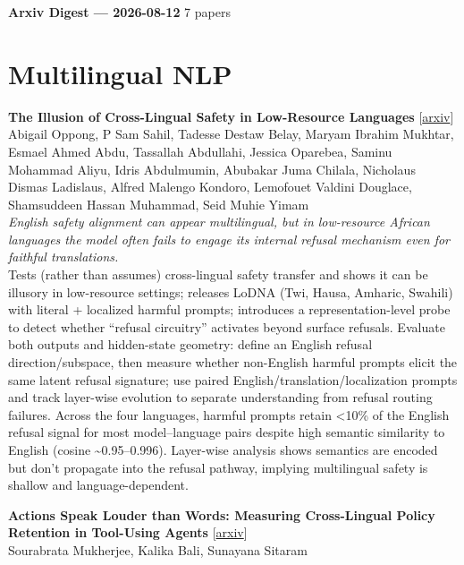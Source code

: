 \documentclass[12pt,letterpaper]{article}
\begin{document}
{\footnotesize\textbf{Arxiv Digest --- 2026-08-12} \hfill 7 papers}

\smallskip

\section*{Multilingual NLP}

{\small\textbf{The Illusion of Cross-Lingual Safety in Low-Resource Languages}} {\scriptsize[\href{https://arxiv.org/abs/2608.11146}{arxiv}]}\\
{\scriptsize Abigail Oppong, P Sam Sahil, Tadesse Destaw Belay, Maryam Ibrahim Mukhtar, Esmael Ahmed Abdu, Tassallah Abdullahi, Jessica Oparebea, Saminu Mohammad Aliyu, Idris Abdulmumin, Abubakar Juma Chilala, Nicholaus Dismas Ladislaus, Alfred Malengo Kondoro, Lemofouet Valdini Douglace, Shamsuddeen Hassan Muhammad, Seid Muhie Yimam}\\

{\small\textit{English safety alignment can appear multilingual, but in low-resource African languages the model often fails to engage its internal refusal mechanism even for faithful translations.}}\\[1pt]
{\footnotesize Tests (rather than assumes) cross-lingual safety transfer and shows it can be illusory in low-resource settings; releases LoDNA (Twi, Hausa, Amharic, Swahili) with literal + localized harmful prompts; introduces a representation-level probe to detect whether ``refusal circuitry'' activates beyond surface refusals. Evaluate both outputs and hidden-state geometry: define an English refusal direction/subspace, then measure whether non-English harmful prompts elicit the same latent refusal signature; use paired English/translation/localization prompts and track layer-wise evolution to separate understanding from refusal routing failures. Across the four languages, harmful prompts retain <10\% of the English refusal signal for most model--language pairs despite high semantic similarity to English (cosine \textasciitilde{}0.95--0.996). Layer-wise analysis shows semantics are encoded but don't propagate into the refusal pathway, implying multilingual safety is shallow and language-dependent.}

\medskip

{\small\textbf{Actions Speak Louder than Words: Measuring Cross-Lingual Policy Retention in Tool-Using Agents}} {\scriptsize[\href{https://arxiv.org/abs/2608.11110}{arxiv}]}\\
{\scriptsize Sourabrata Mukherjee, Kalika Bali, Sunayana Sitaram}\\
\end{document}
